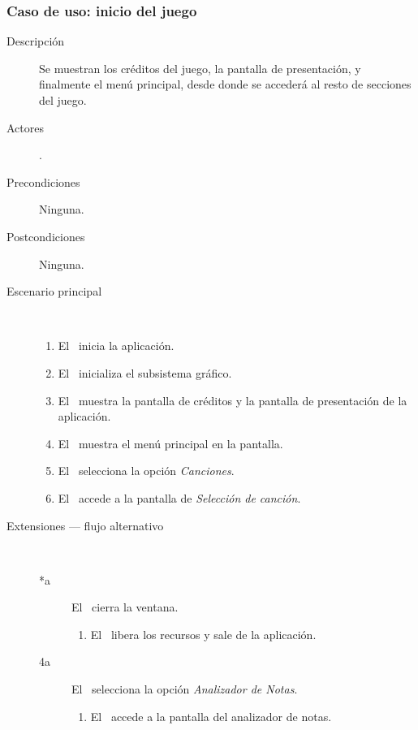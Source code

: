 \subsubsection{Caso de uso: inicio del juego}
\begin{description}
\item [Descripción] Se muestran los créditos del juego, la pantalla de
  presentación, y finalmente el menú principal, desde donde se accederá al
  resto de secciones del juego.
\item [Actores] \jugador.
\item [Precondiciones] Ninguna.
\item [Postcondiciones] Ninguna.
\item [Escenario principal] $\quad$
  \begin{enumerate}
  \item El \jugador\ inicia la aplicación.
  \item El \sistema\ inicializa el subsistema gráfico.
  \item El \sistema\ muestra la pantalla de créditos y la pantalla de
    presentación de la aplicación.
  \item El \sistema\ muestra el menú principal en la pantalla.
  \item El \jugador\ selecciona la opción \textit{Canciones}.
  \item El \sistema\ accede a la pantalla de \textit{Selección de canción}.
  \end{enumerate}
\item[Extensiones --- flujo alternativo] $\quad$
  \begin{description}
  \item [*a] El \jugador\ cierra la ventana.
    \begin{enumerate}
    \item El \sistema\ libera los recursos y sale de la aplicación.
    \end{enumerate}
  \item [4a] El \jugador\ selecciona la opción \textit{Analizador de Notas}.
    \begin{enumerate}
    \item El \sistema\ accede a la pantalla del analizador de notas.
    \end{enumerate}


\end{description}
\end{description}
